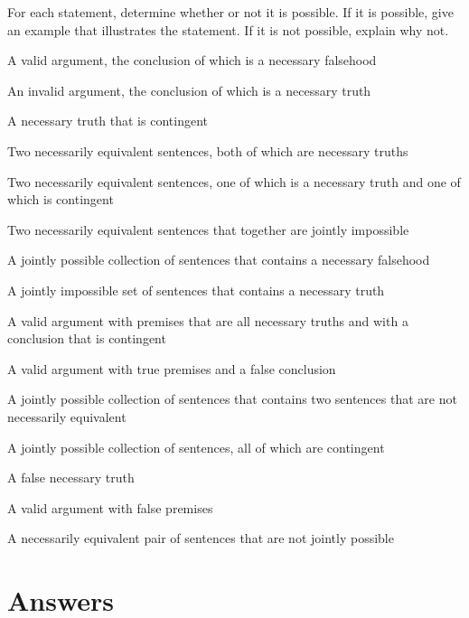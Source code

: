 \problempart
\label{pr.EnglishCombinations2}
For each statement, determine whether or not it is possible. If it is possible, give an example that illustrates the statement. If it is not possible, explain why not.
\begin{earg}
\item A valid argument, the conclusion of which is a necessary falsehood
\item An invalid argument, the conclusion of which is a necessary truth
\item A necessary truth that is contingent
\item Two necessarily equivalent sentences, both of which are necessary truths
\item Two necessarily equivalent sentences, one of which is a necessary truth and one of which is contingent
\item Two necessarily equivalent sentences that together are jointly impossible
\item A jointly possible collection of sentences that contains a necessary falsehood
\item A jointly impossible set of sentences that contains a necessary truth

\item A valid argument with premises that are all necessary truths and with a conclusion that is contingent
\item A valid argument with true premises and a false conclusion
\item A jointly possible collection of sentences that contains two sentences that are not necessarily equivalent
\item A jointly possible collection of sentences, all of which are contingent
\item A false necessary truth
\item A valid argument with false premises
\item A necessarily equivalent pair of sentences that are not jointly possible
\end{earg}



\section{Answers}
\setcounter{ProbPart}{0}

